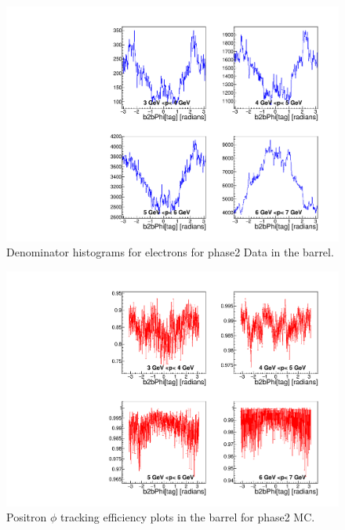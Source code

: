 \documentclass[a4paper,11pt,twosided,final,german,openbib,pdftex,listof=totoc,bibliography=totoc]{scrbook}
\begin{document}
\begin{appendix}
\begin{figure}[!htbp]
	\centering
	\includegraphics[width=\textwidth]{Plots/master/xPMPhiemBarrelD_Data}
	\caption[Momentum $\phi$ Electron Barrel Denominator Histogram Phase2 Data]{Denominator histograms for electrons for phase2 Data in the barrel.}
	\label{plt:PMPhiemBarrelD_Data}
\end{figure}



\begin{figure}[!htbp]
	\centering
	\includegraphics[width=\textwidth]{Plots/master/xPMPhiepBarrel_MC}
	\caption[Momentum $\phi$ Positron Barrel Efficiency Phase2 MC]{Positron $\phi$ tracking efficiency plots in the barrel for phase2 MC.}
	\label{plt:PMPhiepBarrel_MC}
\end{figure}



\end{appendix}
\end{document}
